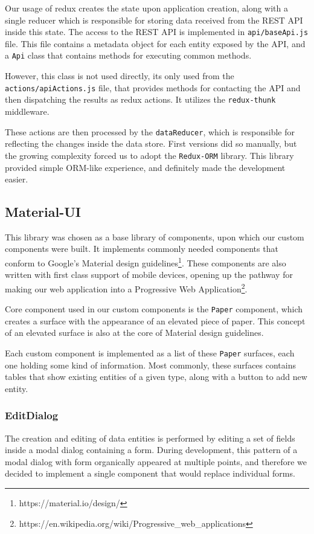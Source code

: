 Our usage of redux creates the state upon application creation, along with a single reducer which is responsible
for storing data received from the REST API inside this state. The access to the REST API is implemented in
\verb|api/baseApi.js| file. This file contains a metadata object for each entity exposed by the API, and
a \verb|Api| class that contains methods for executing common methods.

However, this class is not used directly, its only used from the \verb|actions/apiActions.js| file, that
provides methods for contacting the API and then dispatching the results as redux actions. It utilizes
the \verb|redux-thunk| middleware.

These actions are then processed by the \verb|dataReducer|, which is responsible for reflecting the changes inside the
data store. First versions did so manually, but the growing complexity forced us to adopt the \verb|Redux-ORM| library.
This library provided simple ORM-like experience, and definitely made the development easier.

\subsection{Material-UI}
This library was chosen as a base library of components, upon which our custom components were built.
It implements commonly needed components that conform to Google's Material design guidelines\footnote{https://material.io/design/}.
These components are also written with first class support of mobile devices, opening up the pathway for
making our web application into a Progressive Web Application\footnote{https://en.wikipedia.org/wiki/Progressive\_web\_applications}.

Core component used in our custom components is the \verb|Paper| component, which creates a surface
with the appearance of an elevated piece of paper. This concept of an elevated surface is also at the core of
Material design guidelines.

Each custom component is implemented as a list of these \verb|Paper| surfaces, each one holding some kind of information.
Most commonly, these surfaces contains tables that show existing entities of a given type, along with a button to add new entity.

\subsubsection{EditDialog}
The creation and editing of data entities is performed by editing a set of fields inside a modal dialog containing a
form. During development, this pattern of a modal dialog with form organically appeared at multiple points, and therefore we decided to implement a
single component that would replace individual forms.

